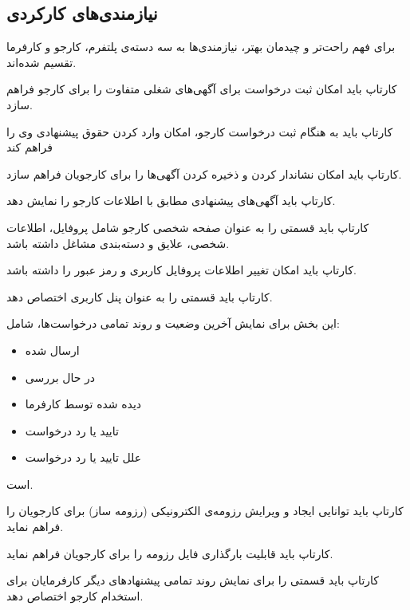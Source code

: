 \clearpage
\subsection{نیازمندی‌های کارکردی}
برای فهم راحت‌تر و چیدمان بهتر، نیازمندی‌ها به سه دسته‌ی پلتفرم، کارجو و کارفرما تقسیم شده‌اند.

\begin{enumerate}
	
	\addeditem
	کارتاپ باید امکان ثبت درخواست برای آگهی‌های شغلی متفاوت را برای کارجو فراهم سازد.
	
	\begin{enumerate}
		\subr 
		کارتاپ باید به هنگام ثبت درخواست کارجو، امکان وارد کردن حقوق پیشنهادی وی را فراهم کند
	\end{enumerate}
	
	\addeditem
	کارتاپ باید امکان نشاندار کردن و ذخیره کردن آگهی‌ها را برای کارجویان فراهم سازد.
	
	\addeditem
	کارتاپ باید آگهی‌های پیشنهادی مطابق با اطلاعات کارجو را نمایش دهد. 
	
	\addeditem
	کارتاپ باید قسمتی را به عنوان صفحه شخصی کارجو شامل پروفایل، اطلاعات شخصی، علایق و دسته‌بندی مشاغل داشته باشد.
	
	\addeditem
	کارتاپ باید امکان تغییر اطلاعات پروفایل کاربری و رمز عبور را داشته باشد.
	
	\addeditem
	کارتاپ باید قسمتی را به عنوان پنل کاربری اختصاص دهد.
	
	این بخش برای نمایش آخرین وضعیت و روند تمامی درخواست‌ها، شامل:
	
	\begin{itemize}
		\item
		ارسال شده
		\item
		در حال بررسی
		\item
		دیده شده توسط کارفرما
		\item
		تایید یا رد درخواست
		\item
		علل تایید یا رد درخواست
	\end{itemize}
	است.
	
	\addeditem
	کارتاپ باید توانایی ایجاد و ویرایش رزومه‌ی الکترونیکی (رزومه ساز) برای کارجویان را فراهم نماید.
	
	\addeditem
	کارتاپ باید قابلیت بارگذاری فایل رزومه را برای کارجویان فراهم نماید. 
	
	\addeditem
	کارتاپ باید قسمتی را برای نمایش روند تمامی پیشنهادهای دیگر کارفرمایان برای استخدام کارجو اختصاص دهد. 
	

\end{enumerate}
